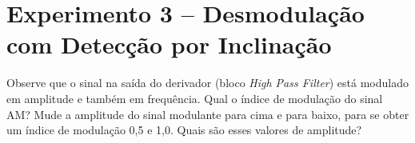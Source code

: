 \documentclass[12pt,addpoints]{exam}
\begin{document}
\section*{Experimento 3 -- Desmodulação com Detecção por Inclinação}

\begin{questions}
    \question Observe que o sinal na saída do derivador (bloco {\em High Pass Filter}) está modulado em amplitude e também em frequência. Qual o índice de modulação do sinal AM? Mude a amplitude do sinal modulante para cima e para baixo, para se obter um índice de modulação 0,5 e 1,0. Quais são esses valores de amplitude? %
    \fillwithlines{1in}


\end{questions}


    
\end{document}
